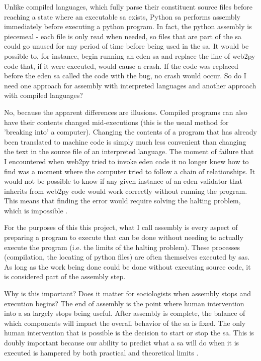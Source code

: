 \documentclass[a4paper,man,natbib,floatsintext]{apa6}
\begin{document}
   Unlike compiled languages, which fully parse their constituent source files before reaching a state where an executable \gls{sa} exists, Python \gls{sa} performs assembly immediately before executing a python program. In fact, the \gls{python} assembly is piecemeal - each file is only read when needed, so files that are part of the \gls{sa} could go unused for any period of time before being used in the \gls{sa}. It would be possible to, for instance, begin running an \acrshort{eden} \gls{sa} and replace the line of web2py code that, if it were executed, would cause a crash. If the code was replaced before the \acrshort{eden} \gls{sa} called the code with the bug, no crash would occur. So do I need one approach for assembly with interpreted languages and another approach with compiled languages?

   No, because the apparent differences are illusions. Compiled programs can also have their contents changed mid-executions (this is the usual method for 'breaking into' a computer). Changing the contents of a program that has already been translated to machine code is simply much less convenient than changing the text in the source file of an interpreted language. The moment of failure that I encountered when web2py tried to invoke \acrshort{eden} code it no longer knew how to find was a moment where the computer tried to follow a chain of relationships. It would not be possible to know if any given instance of an \acrshort{eden} validator that inherits from web2py code would work correctly without running the program. This means that finding the error would require solving the halting problem, which is impossible \citep{Kaplan_undated-xy}. 

   For the purposes of this this project, what I call assembly is every aspect of preparing a program to execute that can be done without needing to actually execute the program (i.e. the limits of the halting problem). These processes (compilation, the locating of python files) are often themselves executed by \glspl{sa}. As long as the work being done could be done without executing source code, it is considered part of the assembly step. 

   Why is this important? Does it matter for sociologists when assembly stops and execution begins? The end of assembly is the point where human intervention into a \gls{sa} largely stops being useful. After assembly is complete, the balance of which components will impact the overall behavior of the \gls{sa} is fixed. The only human intervention that is possible is the decision to start or stop the \gls{sa}. This is doubly important because our ability to predict what a \gls{sa} will do when it is executed is hampered by both practical and theoretical limits \citep{Kaplan_undated-xy}. 
\end{document}
